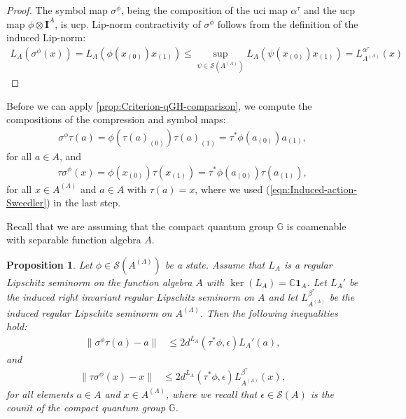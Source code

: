 \documentclass{amsart}
\theoremstyle{plain}
\newtheorem{proposition}[theorem]{Proposition}
\theoremstyle{definition}
\theoremstyle{remark}
\begin{document}
	\begin{proof}
		The symbol map $\sigma^\phi$, being the composition of the uci map $\alpha^\tau$ and the ucp map $\phi \otimes \mathbf{I}^A$, is ucp.
		Lip-norm contractivity of $\sigma^\phi$ follows from the definition of the induced Lip-norm:
		\begin{align}
			L_A(\sigma^\phi(x)) 
			= L_A(\phi(x_{(0)})x_{(1)}) 
			\leq \sup_{\psi \in \mathcal{S}(A^{(\Lambda)})} L_A(\psi(x_{(0)})x_{(1)}) 
			= L_{A^{(\Lambda)}}^{\alpha^\tau}(x)
		\end{align}
	\end{proof}
	
	Before we can apply \autoref{prop:Criterion-qGH-comparison}, we compute the compositions of the compression and symbol maps: 
	\begin{align}\label{eqn:Down-Up}
		\sigma^\phi\tau(a) = \phi(\tau(a)_{(0)}) \tau(a)_{(1)}
		= \tau^*\phi(a_{(0)}) a_{(1)},
	\end{align}
	for all $a \in A$, and
	\begin{align}\label{eqn:Up-Down}
		\tau\sigma^\phi(x)
		= \phi(x_{(0)}) \tau(x_{(1)})
		= \tau^*\phi(a_{(0)}) \tau(a_{(1)}),
	\end{align}
	for all $x \in A^{(\Lambda)}$ and $a \in A$ with $\tau(a) = x$, where we used (\ref{eqn:Induced-action-Sweedler}) in the last step.
	
	Recall that we are assuming that the compact quantum group $\mathbb{G}$ is coamenable with separable function algebra $A$.
	
	\begin{proposition}\label{prop:C1-Approximate-Order-Iso}
		Let $\phi \in \mathcal{S}(A^{(\Lambda)})$ be a state.
		Assume that $L_A$ is a regular Lipschitz seminorm on the function algebra $A$ with $\ker(L_A) = \mathbb{C}\mathbf{1}_A$.
		Let $L_A'$ be the induced right invariant regular Lipschitz seminorm on $A$ and let $L_{A^{(\Lambda)}}^{\beta^\tau}$ be the induced regular Lipschitz seminorm on $A^{(\Lambda)}$.
		Then the following inequalities hold:
		\begin{align}
			\lVert\sigma^\phi\tau(a)-a\rVert 
			&\leq 2 d^{L_A}(\tau^*\phi,\epsilon) L_A'(a),
		\end{align}
		and
		\begin{align}
			\lVert\tau\sigma^\phi(x)-x\rVert
			&\leq 2 d^{L_A}(\tau^*\phi,\epsilon) L_{A^{(\Lambda)}}^{\beta^\tau}(x),
		\end{align}
		for all elements $a \in A$ and $x \in A^{(\Lambda)}$, where we recall that $\epsilon \in \mathcal{S}(A)$ is the counit of the compact quantum group $\mathbb{G}$.
	\end{proposition}
	
\end{document}
